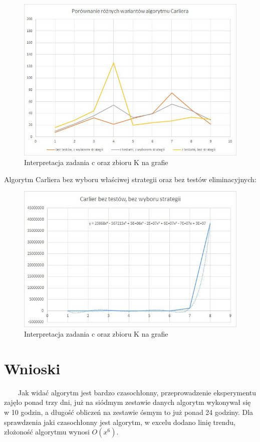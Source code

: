 \documentclass[11pt]{article}
\begin{document}
\begin{figure}[!h]
\centering
\includegraphics[scale=0.6]{Wykres_1}
\caption{Interpretacja zadania c oraz zbioru K na grafie}
\end{figure}

 Algorytm Carliera bez wyboru właściwej strategii oraz bez testów eliminacyjnych:

\begin{figure}[!h]
\centering
\includegraphics[scale=0.6]{wykres_2}
\caption{Interpretacja zadania c oraz zbioru K na grafie}
\end{figure}

\newpage
\section{Wnioski} 
~~~~Jak widać algorytm jest bardzo czasochłonny, przeprowadzenie eksperymentu zajęło ponad trzy dni, już na siódmym zestawie danych algorytm wykonywał się w 10 godzin, a długość obliczeń na zestawie ósmym to już ponad 24 godziny. Dla sprawdzenia jaki czasochłonny jest algorytm, w excelu dodano linię trendu, złożoność algorytmu wynosi $O(x^6)$.
\end{document}

